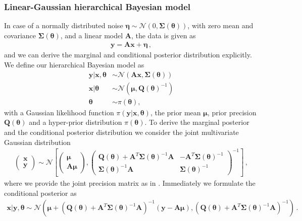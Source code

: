 \subsubsection{Linear-Gaussian hierarchical Bayesian model}
In case of a normally distributed noise $\bm{\eta} \sim \mathcal{N}(0,\bm{\Sigma}(\bm{\theta}))$, with zero mean and covariance $\bm{\Sigma}(\bm{\theta})$, and a linear model $\bm{A}$, the data is given as 
\begin{align}
	\bm{y} = \bm{A} \bm{x} + \bm{\eta} \, ,
	\label{eq:LinDat}
\end{align}
and we can derive the marginal and conditional posterior distribution explicitly.
We define our hierarchical Bayesian model as
\begin{subequations}
	\begin{align}
		\bm{y} |  \bm{x}, \bm{\theta} &\sim \mathcal{N}(\bm{A} \bm{x}, \bm{\Sigma}(\bm{\theta}) ) \\
		\bm{x} |  \bm{\theta} &\sim \mathcal{N}(\bm{\mu}, \bm{Q}(\bm{\theta})^{-1} ) \\
		\bm{\theta} &\sim \pi(\bm{\theta}) ,
	\end{align}
	\label{eq:GenBayMode}
\end{subequations}
with a Gaussian likelihood function $\pi(\bm{y} |  \bm{x}, \bm{\theta} )$, the prior mean $\bm{\mu}$, prior precision $\bm{Q}(\bm{\theta})$ and a hyper-prior distribution $\pi(\bm{\theta})$.
To derive the marginal posterior and the conditional posterior distribution we consider the joint multivariate Gaussian distribution
\begin{align}
	\begin{pmatrix}
	\bm{x} \\
	\bm{y}
\end{pmatrix}\sim \mathcal{N}\left[  \begin{pmatrix}
	\bm{\mu} \\
	\bm{A}\bm{\mu}
\end{pmatrix},\begin{pmatrix}
	\bm{Q}(\bm{\theta}) + \bm{A}^T \bm{\Sigma}(\bm{\theta})^{-1} \bm{A} & - \bm{A}^T \bm{\Sigma}(\bm{\theta})^{-1} \\
	 \bm{\Sigma}(\bm{\theta})^{-1} \bm{A} & \bm{\Sigma}(\bm{\theta})^{-1} 
\end{pmatrix}^{-1} \right] \, ,
\end{align}
where we provide the joint precision matrix as in \cite{SIMPSON201216}.
Immediately we formulate the conditional posterior as 
\begin{align}
	\bm{x} | \bm{y}, \bm{\theta} \sim \mathcal{N}(\bm{\mu} + (\bm{Q}(\bm{\theta}) + \bm{A}^T \bm{\Sigma}(\bm{\theta})^{-1} \bm{A})^{-1}(\bm{y} - \bm{A}\bm{\mu}),(\bm{Q}(\bm{\theta}) + \bm{A}^T \bm{\Sigma}(\bm{\theta})^{-1} \bm{A})^{-1}) \, .
\end{align}
